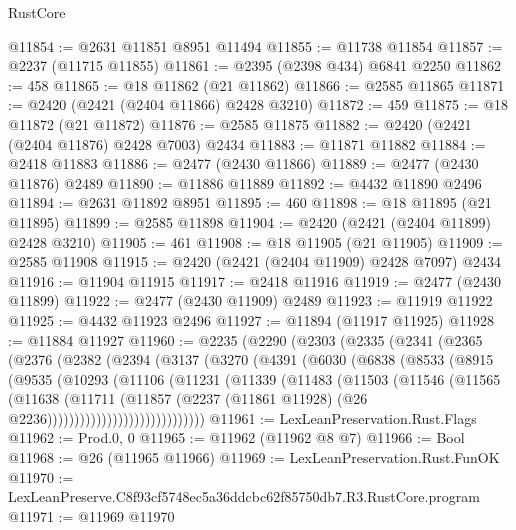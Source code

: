 \begin{lexlean}{RustCore}
\begin{coremodule}
@11854 := @2631 @11851 @8951 @11494
@11855 := @11738 @11854
@11857 := @2237 (@11715 @11855)
@11861 := @2395 (@2398 @434) @6841 @2250
@11862 := 458
@11865 := @18 @11862 (@21 @11862)
@11866 := @2585 @11865
@11871 := @2420 (@2421 (@2404 @11866) @2428 @3210)
@11872 := 459
@11875 := @18 @11872 (@21 @11872)
@11876 := @2585 @11875
@11882 := @2420 (@2421 (@2404 @11876) @2428 @7003) @2434
@11883 := @11871 @11882
@11884 := @2418 @11883
@11886 := @2477 (@2430 @11866)
@11889 := @2477 (@2430 @11876) @2489
@11890 := @11886 @11889
@11892 := @4432 @11890 @2496
@11894 := @2631 @11892 @8951
@11895 := 460
@11898 := @18 @11895 (@21 @11895)
@11899 := @2585 @11898
@11904 := @2420 (@2421 (@2404 @11899) @2428 @3210)
@11905 := 461
@11908 := @18 @11905 (@21 @11905)
@11909 := @2585 @11908
@11915 := @2420 (@2421 (@2404 @11909) @2428 @7097) @2434
@11916 := @11904 @11915
@11917 := @2418 @11916
@11919 := @2477 (@2430 @11899)
@11922 := @2477 (@2430 @11909) @2489
@11923 := @11919 @11922
@11925 := @4432 @11923 @2496
@11927 := @11894 (@11917 @11925)
@11928 := @11884 @11927
@11960 := @2235
    (@2290
      (@2303
        (@2335
          (@2341
            (@2365
              (@2376
                (@2382
                  (@2394
                    (@3137
                      (@3270
                        (@4391
                          (@6030
                            (@6838
                              (@8533
                                (@8915
                                  (@9535
                                    (@10293
                                      (@11106
                                        (@11231
                                          (@11339
                                            (@11483
                                              (@11503
                                                (@11546
                                                  (@11565
                                                    (@11638
                                                      (@11711
                                                        (@11857
                                                          (@2237
                                                            (@11861 @11928)
                                                            (@26 @2236)))))))))))))))))))))))))))))
@11961 := LexLeanPreservation.Rust.Flags
@11962 := Prod.{0, 0}
@11965 := @11962 (@11962 @8 @7)
@11966 := Bool
@11968 := @26 (@11965 @11966)
@11969 := LexLeanPreservation.Rust.FunOK
@11970 := LexLeanPreserve.C8f93cf5748ec5a36ddcbc62f85750db7.R3.RustCore.program
@11971 := @11969 @11970

\end{coremodule}
\end{lexlean}
